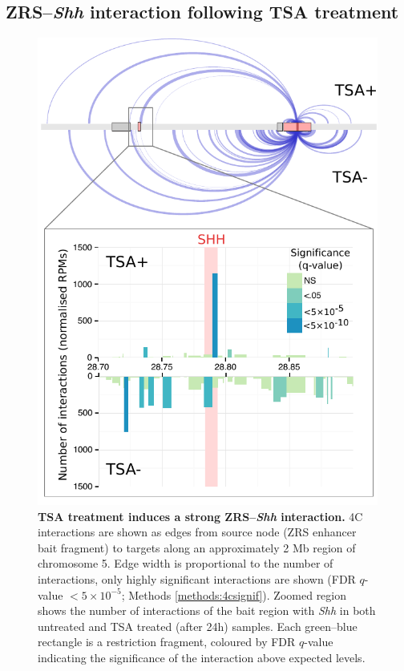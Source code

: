 \documentclass[a4paper,11pt,oneside]{book}
\begin{document}

\subsection{ZRS--\emph{Shh} interaction following TSA treatment}

\begin{figure}
\begin{center} 
\includegraphics[width=5in]{shharc_full.pdf}
\captionsetup{width=\textwidth} 
\caption[TSA treatment induces a strong ZRS--\emph{Shh} interaction. ]{ {\bf TSA treatment induces a strong ZRS--\emph{Shh} interaction. }
4C interactions are shown as edges from source node (ZRS enhancer bait fragment) to targets along an approximately 2 Mb region of chromosome 5. Edge width is proportional to the number of interactions, only highly significant interactions are shown (FDR $q$-value $<5 \times 10 ^{-5}$; Methods \ref{methods:4csignif}). Zoomed region shows the number of interactions of the bait region with \emph{Shh} in both untreated and TSA treated (after 24h) samples. Each green--blue rectangle is a restriction fragment, coloured by FDR $q$-value indicating the significance of the interaction above expected levels.
}\label{fig:ssharc}
\end{center} 
\end{figure} 
\end{document}
